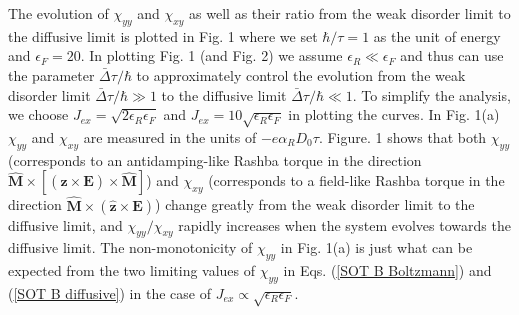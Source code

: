 \documentclass
[aps,pra,amsfonts,amssymb,twocolumn,amsmath,preprintnumbers,nofootinbib,floatfix,
showpacs,superscriptaddress]{revtex4-1}%
\begin{document}
The evolution of $\chi_{yy}$ and $\chi_{xy}$ as well as their ratio from the
weak disorder limit to the diffusive limit is plotted in Fig. 1 where we set
$\hbar/\tau=1$ as the unit of energy and $\epsilon_{F}=20$. In plotting Fig. 1
(and Fig. 2) we assume $\epsilon_{R}\ll\epsilon_{F}$ and thus can use the
parameter $\bar{\Delta}\tau/\hbar$ to approximately control the evolution from
the weak disorder limit $\bar{\Delta}\tau/\hbar\gg1$ to the diffusive limit
$\bar{\Delta}\tau/\hbar\ll1$. To simplify the analysis, we choose
$J_{ex}=\sqrt{2\epsilon_{R}\epsilon_{F}}$ and $J_{ex}=10\sqrt{\epsilon
_{R}\epsilon_{F}}$ in plotting the curves. In Fig. 1(a) $\chi_{yy}$ and
$\chi_{xy}$ are measured in the units of $-e\alpha_{R}D_{0}\tau$. Figure. 1
shows that both $\chi_{yy}$ (corresponds to an antidamping-like Rashba torque
in the direction $\mathbf{\hat{M}}\times\left[  \left(  \mathbf{\hat{z}}%
\times\mathbf{E}\right)  \times\mathbf{\hat{M}}\right]  $) and $\chi_{xy}$
(corresponds to a field-like Rashba torque in the direction $\mathbf{\hat{M}%
}\times\left(  \mathbf{\hat{z}}\times\mathbf{E}\right)  $) change greatly from
the weak disorder limit to the diffusive limit, and $\chi_{yy}/\chi_{xy}$
rapidly increases when the system evolves towards the diffusive limit. The
non-monotonicity of $\chi_{yy}$ in Fig. 1(a) is just what can be expected from
the two limiting values of $\chi_{yy}$ in Eqs. (\ref{SOT B Boltzmann}) and
(\ref{SOT B diffusive}) in the case of $J_{ex}\propto\sqrt{\epsilon
_{R}\epsilon_{F}}$.
\end{document}
